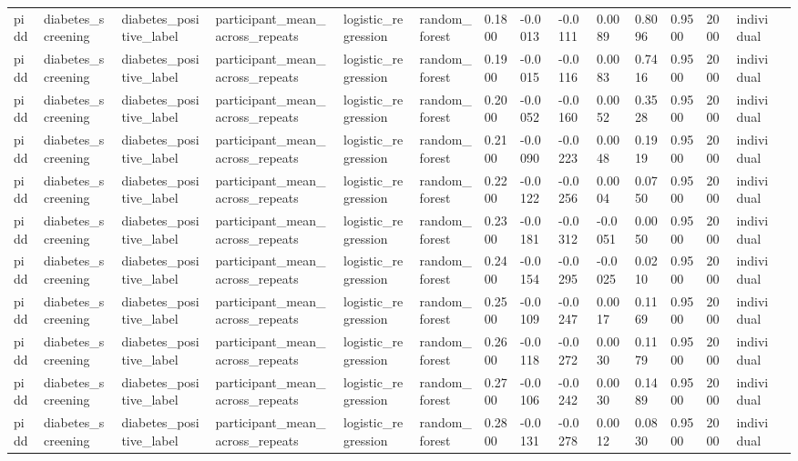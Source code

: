 \begin{tabular}{lllllllllllllll}
pidd & diabetes\_screening & diabetes\_positive\_label & participant\_mean\_across\_repeats & logistic\_regression & random\_forest & 0.1800 & -0.0013 & -0.0111 & 0.0089 & 0.8096 & 0.9500 & 2000 & individual &  \\
pidd & diabetes\_screening & diabetes\_positive\_label & participant\_mean\_across\_repeats & logistic\_regression & random\_forest & 0.1900 & -0.0015 & -0.0116 & 0.0083 & 0.7416 & 0.9500 & 2000 & individual &  \\
pidd & diabetes\_screening & diabetes\_positive\_label & participant\_mean\_across\_repeats & logistic\_regression & random\_forest & 0.2000 & -0.0052 & -0.0160 & 0.0052 & 0.3528 & 0.9500 & 2000 & individual &  \\
pidd & diabetes\_screening & diabetes\_positive\_label & participant\_mean\_across\_repeats & logistic\_regression & random\_forest & 0.2100 & -0.0090 & -0.0223 & 0.0048 & 0.1919 & 0.9500 & 2000 & individual &  \\
pidd & diabetes\_screening & diabetes\_positive\_label & participant\_mean\_across\_repeats & logistic\_regression & random\_forest & 0.2200 & -0.0122 & -0.0256 & 0.0004 & 0.0750 & 0.9500 & 2000 & individual &  \\
pidd & diabetes\_screening & diabetes\_positive\_label & participant\_mean\_across\_repeats & logistic\_regression & random\_forest & 0.2300 & -0.0181 & -0.0312 & -0.0051 & 0.0050 & 0.9500 & 2000 & individual &  \\
pidd & diabetes\_screening & diabetes\_positive\_label & participant\_mean\_across\_repeats & logistic\_regression & random\_forest & 0.2400 & -0.0154 & -0.0295 & -0.0025 & 0.0210 & 0.9500 & 2000 & individual &  \\
pidd & diabetes\_screening & diabetes\_positive\_label & participant\_mean\_across\_repeats & logistic\_regression & random\_forest & 0.2500 & -0.0109 & -0.0247 & 0.0017 & 0.1169 & 0.9500 & 2000 & individual &  \\
pidd & diabetes\_screening & diabetes\_positive\_label & participant\_mean\_across\_repeats & logistic\_regression & random\_forest & 0.2600 & -0.0118 & -0.0272 & 0.0030 & 0.1179 & 0.9500 & 2000 & individual &  \\
pidd & diabetes\_screening & diabetes\_positive\_label & participant\_mean\_across\_repeats & logistic\_regression & random\_forest & 0.2700 & -0.0106 & -0.0242 & 0.0030 & 0.1489 & 0.9500 & 2000 & individual &  \\
pidd & diabetes\_screening & diabetes\_positive\_label & participant\_mean\_across\_repeats & logistic\_regression & random\_forest & 0.2800 & -0.0131 & -0.0278 & 0.0012 & 0.0830 & 0.9500 & 2000 & individual &  \\

\end{tabular}
